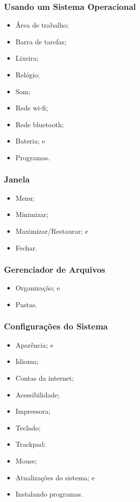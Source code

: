 \documentclass[aspectratio=169]{beamer} %
\begin{document}
\begin{frame}
	\frametitle{Usando um Sistema Operacional}
		
	\begin{itemize}
		\item Área de trabalho;
		\item Barra de tarefas;
		\item Lixeira;
		\item Relógio;
		\item Som;
		\item Rede wi-fi;
		\item Rede bluetooth;
		\item Bateria; e
		\item Programas.
	\end{itemize}
\end{frame}

\begin{frame}
	\frametitle{Janela}
		
	\begin{itemize}
		\item Menu;
		\item Minimizar;
		\item Maximizar/Restaurar; e
		\item Fechar.
	\end{itemize}
\end{frame}

\begin{frame}
	\frametitle{Gerenciador de Arquivos}
		
	\begin{itemize}
		\item Organiza\c cão; e
		\item Pastas.
	\end{itemize}
\end{frame}

\begin{frame}
	\frametitle{Configura\c cões do Sistema}
		
	\begin{itemize}
		\item Aparência; e
		\item Idioma;
		\item Contas da internet;
		\item Acessibilidade;
		\item Impressora;
		\item Teclado;
		\item Trackpad;
		\item Mouse;
		\item Atualiza\c cões do sistema; e
		\item Instalando programas.
	\end{itemize}
\end{frame}
\end{document}
